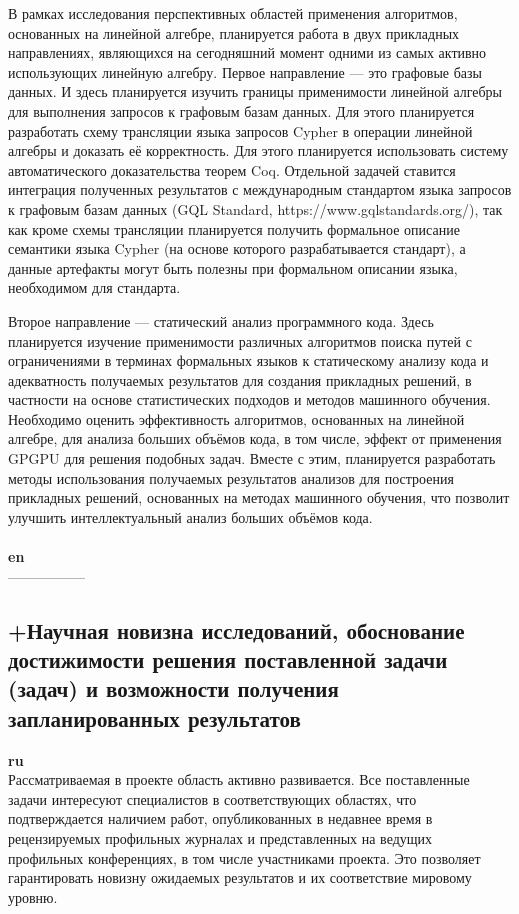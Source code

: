 \documentclass[12pt]{article}  %
\theoremstyle{remark}
\begin{document}
В рамках исследования перспективных областей применения алгоритмов, основанных на линейной алгебре, планируется работа в двух прикладных направлениях, являющихся на сегодняшний момент одними из самых активно использующих линейную алгебру. Первое направление --- это графовые базы данных. И здесь планируется изучить границы применимости линейной алгебры для выполнения запросов к графовым базам данных. Для этого планируется разработать схему трансляции языка запросов Cypher в операции линейной алгебры и доказать её корректность. Для этого планируется использовать систему автоматического доказательства теорем Coq. Отдельной задачей ставится интеграция полученных результатов с международным стандартом языка запросов к графовым базам данных (GQL Standard, https://www.gqlstandards.org/), так как кроме схемы трансляции планируется получить формальное описание семантики языка Cypher (на основе которого разрабатывается стандарт), а данные артефакты могут быть полезны при формальном описании языка, необходимом для стандарта.

Второе направление --- статический анализ программного кода. Здесь планируется изучение применимости различных алгоритмов поиска путей с ограничениями в терминах формальных языков к статическому анализу кода и адекватность получаемых результатов для создания прикладных решений, в частности на основе статистических подходов и методов машинного обучения. Необходимо оценить эффективность алгоритмов, основанных на линейной алгебре, для анализа больших объёмов кода, в том числе, эффект от применения GPGPU для решения подобных задач. Вместе с этим, планируется разработать методы использования получаемых результатов анализов для построения прикладных решений, основанных на методах машинного обучения, что позволит улучшить интеллектуальный анализ больших объёмов кода.
\\
\\
\textbf{en}\\
-----------------

\subsection{+Научная новизна исследований, обоснование достижимости решения поставленной задачи (задач) и возможности получения запланированных результатов}

\textbf{ru}\\

Рассматриваемая в проекте область активно развивается. Все поставленные задачи интересуют специалистов в соответствующих областях, что подтверждается наличием работ, опубликованных в недавнее время в рецензируемых профильных журналах и представленных на ведущих профильных конференциях, в том числе участниками проекта. Это позволяет гарантировать новизну ожидаемых результатов и их соответствие мировому уровню.
\end{document}
